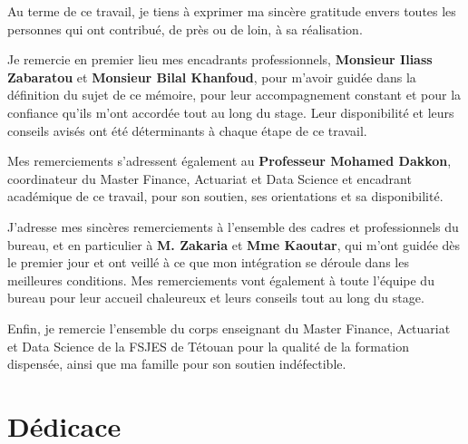 \documentclass[12pt,a4paper]{article}
\begin{document}
\begin{center}

Au terme de ce travail, je tiens à exprimer ma sincère gratitude envers toutes les personnes qui ont contribué, de près ou de loin, à sa réalisation.

\vspace{0.4cm}

Je remercie en premier lieu mes encadrants professionnels, \textbf{Monsieur Iliass Zabaratou} et \textbf{Monsieur Bilal Khanfoud}, pour m'avoir guidée dans la définition du sujet de ce mémoire, pour leur accompagnement constant et pour la confiance qu'ils m'ont accordée tout au long du stage. Leur disponibilité et leurs conseils avisés ont été déterminants à chaque étape de ce travail.

\vspace{0.4cm}

Mes remerciements s'adressent également au \textbf{Professeur Mohamed Dakkon}, coordinateur du Master Finance, Actuariat et Data Science et encadrant académique de ce travail, pour son soutien, ses orientations et sa disponibilité.

 \vspace{0.4cm}

J'adresse mes sincères remerciements à l'ensemble des cadres et professionnels du bureau, et en particulier à \textbf{M. Zakaria} et \textbf{Mme Kaoutar}, qui m'ont guidée dès le premier jour et ont veillé à ce que mon intégration se déroule dans les meilleures conditions. Mes remerciements vont également à toute l'équipe du bureau pour leur accueil chaleureux et leurs conseils tout au long du stage.

\vspace{0.4cm}

Enfin, je remercie l'ensemble du corps enseignant du Master Finance, Actuariat et Data Science de la FSJES de Tétouan pour la qualité de la formation dispensée, ainsi que ma famille pour son soutien indéfectible.

\end{center}

\newpage

\section*{D\'edicace}
\end{document}
